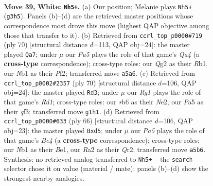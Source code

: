 \documentclass[11pt]{article}
\begin{document}
\clearpage

\begin{figure}[p]\centering
\begin{subfigure}{0.46\textwidth}\centering
\resizebox{\linewidth}{!}{%
\newchessgame
\chessboard[
  setfen={2b3k1/p1qn1r1p/1r3b2/P4P2/1p1p4/1p4N1/R3P1Q1/1NBK2R1 w - - 0 39},
  showmover=false,
  pgfstyle=straightmove, color=movearrow, markmove={g3-h5}
]}
\caption{}
\end{subfigure}\hfill
\begin{subfigure}{0.46\textwidth}\centering
\resizebox{\linewidth}{!}{%
\newchessgame
\chessboard[
  setfen={2r3k1/5pb1/1pr1n1p1/3q3p/QB1pN2P/P2P2P1/5P2/1R2R1K1 w - - 8 36},
  showmover=false,
  pgfstyle=straightmove, color=movearrow, markmove={a4-a7}
]}
\caption{}
\end{subfigure}
\\[4pt]
\begin{subfigure}{0.46\textwidth}\centering
\resizebox{\linewidth}{!}{%
\newchessgame
\chessboard[
  setfen={2b1r1k1/4r1b1/p3pnP1/1pBp4/1P3P1R/5q2/2P1N2Q/3RK3 w - - 0 36},
  showmover=false,
  pgfstyle=straightmove, color=movearrow, markmove={d1-d3}
]}
\caption{}
\end{subfigure}\hfill
\begin{subfigure}{0.46\textwidth}\centering
\resizebox{\linewidth}{!}{%
\newchessgame
\chessboard[
  setfen={6rk/1p4b1/p3q2p/P2r3n/1P2BPp1/R6P/2Q1N2K/4B3 w - - 1 34},
  showmover=false,
  pgfstyle=straightmove, color=movearrow, markmove={e4-d5}
]}
\caption{}
\end{subfigure}
\caption{\textbf{Move 39, White: \texttt{Nh5+}.} (a) Our position; Melanie plays \texttt{Nh5+} (\texttt{g3h5}). Panels (b)--(d) are the retrieved master positions whose correspondence most drove this move (highest QAP objective among those that transfer to it). (b) Retrieved from \texttt{ccrl\_top\_p0000\#719} (ply 70) [structural distance $d$=113, QAP obj=24]: the master played \texttt{Qa7}; under $\mu$ our \emph{Pa5} plays the role of that game's \emph{Qa4} (a \textbf{cross-type} correspondence); cross-type roles: our \emph{Q}g2 as their \emph{R}b1, our \emph{N}b1 as their \emph{P}f2; transferred move \texttt{a5a6}. (c) Retrieved from \texttt{ccrl\_top\_p0002\#2357} (ply 70) [structural distance $d$=106, QAP obj=24]: the master played \texttt{Rd3}; under $\mu$ our \emph{Rg1} plays the role of that game's \emph{Rd1}; cross-type roles: our \emph{r}b6 as their \emph{N}e2, our \emph{P}a5 as their \emph{q}f3; transferred move \texttt{g1h1}. (d) Retrieved from \texttt{ccrl\_top\_p0000\#633} (ply 66) [structural distance $d$=106, QAP obj=23]: the master played \texttt{Bxd5}; under $\mu$ our \emph{Pa5} plays the role of that game's \emph{Be4} (a \textbf{cross-type} correspondence); cross-type roles: our \emph{N}b1 as their \emph{B}e1, our \emph{R}a2 as their \emph{Q}c2; transferred move \texttt{a5b6}. Synthesis: no retrieved analog transferred to \texttt{Nh5+} -- the \texttt{search} selector chose it on value (material / mate); panels (b)--(d) show the strongest nearby analogies.}
\label{fig:thought-m76}
\end{figure}
\end{document}
